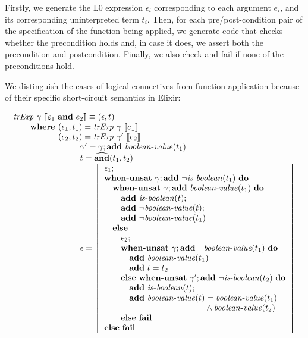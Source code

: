 Firstly, we generate the L0 expression $\epsilon_i$ corresponding to each 
argument $e_i$, and its corresponding uninterpreted term $t_i$. Then, for 
each pre/post-condition pair of the specification of the function being
applied, we generate code that checks whether the precondition holds and, 
in case it does, we assert both the precondition and postcondition. Finally,
we also check and fail if none of the preconditions hold.

We distinguish the cases of logical connectives from function application
because of their specific short-circuit semantics in Elixir:

\[
\begin{array}{l}
\trExp{\gamma}{\andE{e_1}{e_2}} \equiv (\epsilon, t)\\
\qquad \textbf{where }(\epsilon_1, t_1) = \trExp{\gamma}{e_1}\\
\qquad \phantom{\textbf{where }}(\epsilon_2, t_2) = \trExp{\gamma'}{e_2}\\
\qquad\qquad\qquad\qquad \gamma' = \gamma;\addE~\booleanvalue{t_1}\\
\qquad\qquad\qquad\qquad t = \widehat{\mathbf{and}}(t_1, t_2)\\
\qquad\qquad\qquad\qquad \epsilon = \left[ 
\begin{array}{l}
\epsilon_1;\\
\whenUnsatW~\gamma;\addE~\neg\isboolean{t_1}~\doW\\
\quad\whenUnsatW~\gamma;\addE~\booleanvalue{t_1}~\doW\\
\quad\quad\addE~\isboolean{t};\\
\quad\quad\addE~\neg\booleanvalue{t};\\
\quad\quad\addE~\neg\booleanvalue{t_1}\\
\quad\elseW\\
\quad\quad\epsilon_2;\\
\quad\quad\whenUnsatW~\gamma;\addE~\neg\booleanvalue{t_1}~\doW\\
\quad\quad\quad\addE~\booleanvalue{t_1}\\
\quad\quad\quad\addE~t = t_2\\
\quad\quad\elseW~\whenUnsatW~\gamma';\addE~\neg\isboolean{t_2}~\doW\\
\quad\quad\quad\addE~\isboolean{t};\\
\quad\quad\quad\addE~\booleanvalue{t} = \booleanvalue{t_1} \\
\quad\phantom{\quad\quad\addE~\booleanvalue{t}} \land \booleanvalue{t_2}\\
\quad\quad\elseW~\failE\\
\elseW~\failE
\end{array}
\right] \\
\end{array}
\]

